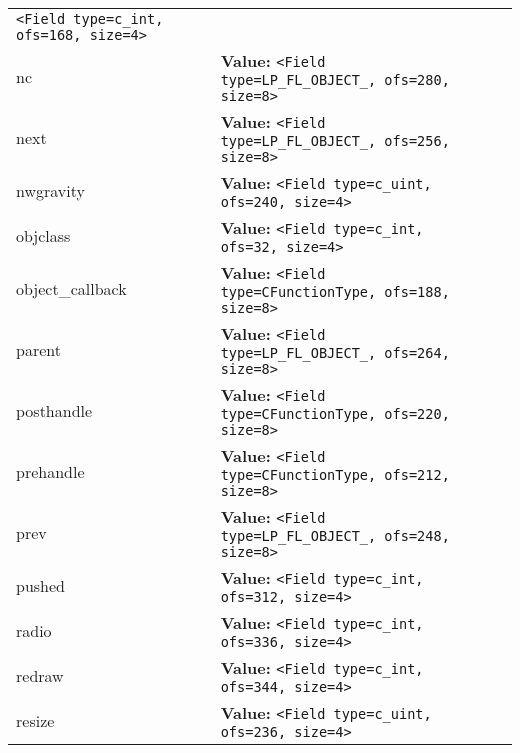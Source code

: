 \begin{longtable}{|p{\varnamewidth}|p{\vardescrwidth}|l}
{\tt {\textless}Field type=c\_int, ofs=168, size=4{\textgreater}}&\\
\cline{1-2}
\raggedright n\-c\- & \raggedright \textbf{Value:} 
{\tt {\textless}Field type=LP\_FL\_OBJECT\_, ofs=280, size=8{\textgreater}}&\\
\cline{1-2}
\raggedright n\-e\-x\-t\- & \raggedright \textbf{Value:} 
{\tt {\textless}Field type=LP\_FL\_OBJECT\_, ofs=256, size=8{\textgreater}}&\\
\cline{1-2}
\raggedright n\-w\-g\-r\-a\-v\-i\-t\-y\- & \raggedright \textbf{Value:} 
{\tt {\textless}Field type=c\_uint, ofs=240, size=4{\textgreater}}&\\
\cline{1-2}
\raggedright o\-b\-j\-c\-l\-a\-s\-s\- & \raggedright \textbf{Value:} 
{\tt {\textless}Field type=c\_int, ofs=32, size=4{\textgreater}}&\\
\cline{1-2}
\raggedright o\-b\-j\-e\-c\-t\-\_\-c\-a\-l\-l\-b\-a\-c\-k\- & \raggedright \textbf{Value:} 
{\tt {\textless}Field type=CFunctionType, ofs=188, size=8{\textgreater}}&\\
\cline{1-2}
\raggedright p\-a\-r\-e\-n\-t\- & \raggedright \textbf{Value:} 
{\tt {\textless}Field type=LP\_FL\_OBJECT\_, ofs=264, size=8{\textgreater}}&\\
\cline{1-2}
\raggedright p\-o\-s\-t\-h\-a\-n\-d\-l\-e\- & \raggedright \textbf{Value:} 
{\tt {\textless}Field type=CFunctionType, ofs=220, size=8{\textgreater}}&\\
\cline{1-2}
\raggedright p\-r\-e\-h\-a\-n\-d\-l\-e\- & \raggedright \textbf{Value:} 
{\tt {\textless}Field type=CFunctionType, ofs=212, size=8{\textgreater}}&\\
\cline{1-2}
\raggedright p\-r\-e\-v\- & \raggedright \textbf{Value:} 
{\tt {\textless}Field type=LP\_FL\_OBJECT\_, ofs=248, size=8{\textgreater}}&\\
\cline{1-2}
\raggedright p\-u\-s\-h\-e\-d\- & \raggedright \textbf{Value:} 
{\tt {\textless}Field type=c\_int, ofs=312, size=4{\textgreater}}&\\
\cline{1-2}
\raggedright r\-a\-d\-i\-o\- & \raggedright \textbf{Value:} 
{\tt {\textless}Field type=c\_int, ofs=336, size=4{\textgreater}}&\\
\cline{1-2}
\raggedright r\-e\-d\-r\-a\-w\- & \raggedright \textbf{Value:} 
{\tt {\textless}Field type=c\_int, ofs=344, size=4{\textgreater}}&\\
\cline{1-2}
\raggedright r\-e\-s\-i\-z\-e\- & \raggedright \textbf{Value:} 
{\tt {\textless}Field type=c\_uint, ofs=236, size=4{\textgreater}}&\\

\end{longtable}
